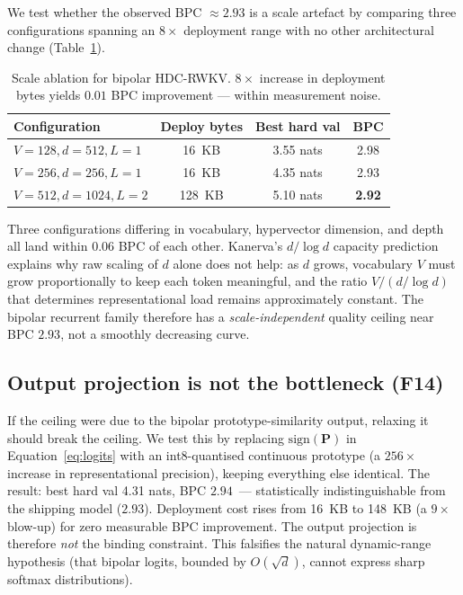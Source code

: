 \documentclass[runningheads]{llncs}
\newcommand{\bP}{\mathbf{P}}
\begin{document}
We test whether the observed BPC ${\approx}2.93$ is a scale artefact
by comparing three configurations spanning an $8\times$ deployment
range with no other architectural change
(Table~\ref{tab:f13-scale-inline}).

\begin{table}[h]
\centering
\caption{Scale ablation for bipolar HDC-RWKV. $8\times$ increase in
deployment bytes yields $0.01$ BPC improvement --- within measurement
noise.}
\label{tab:f13-scale-inline}
\small
\begin{tabular}{@{}lccc@{}}
\toprule
Configuration                  & Deploy bytes & Best hard val & BPC \\
\midrule
$V{=}128, d{=}512, L{=}1$      & 16~KB        & 3.55 nats     & 2.98 \\
$V{=}256, d{=}256, L{=}1$      & 16~KB        & 4.35 nats     & 2.93 \\
$V{=}512, d{=}1024, L{=}2$     & 128~KB       & 5.10 nats     & \textbf{2.92} \\
\bottomrule
\end{tabular}
\end{table}

Three configurations differing in vocabulary, hypervector dimension,
and depth all land within $0.06$ BPC of each other. Kanerva's
$d/\log d$ capacity prediction~\cite{kanerva2009hyperdimensional}
explains why raw scaling of $d$ alone does not help: as $d$ grows,
vocabulary $V$ must grow proportionally to keep each token meaningful,
and the ratio $V/(d/\log d)$ that determines representational load
remains approximately constant. The bipolar recurrent family therefore
has a \emph{scale-independent} quality ceiling near
BPC $2.93$, not a smoothly decreasing curve.

\subsection{Output projection is not the bottleneck (F14)}
\label{sec:results:output}

If the ceiling were due to the bipolar prototype-similarity output,
relaxing it should break the ceiling. We test this by replacing
$\mathrm{sign}(\bP)$ in Equation~\ref{eq:logits} with an int8-quantised
continuous prototype (a $256\times$ increase in representational
precision), keeping everything else identical. The result: best hard
val 4.31 nats, BPC $2.94$~--- statistically indistinguishable from
the shipping model ($2.93$). Deployment cost rises from 16~KB to 148~KB (a
$9\times$ blow-up) for zero measurable BPC improvement. The output
projection is therefore \emph{not} the binding constraint. This
falsifies the natural dynamic-range hypothesis (that bipolar
logits, bounded by $O(\sqrt{d})$, cannot express sharp softmax
distributions).
\end{document}
